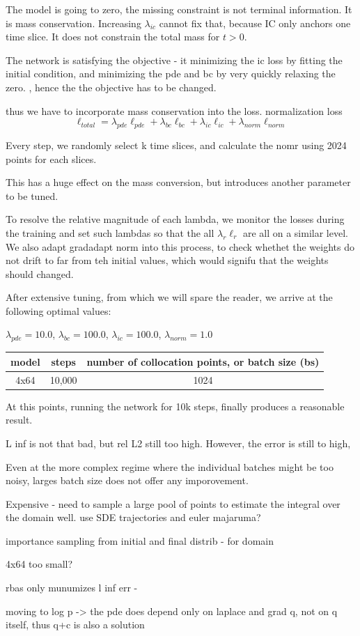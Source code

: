 The model is going to zero, the missing constraint is not terminal information. It is mass conservation.
Increasing $\lambda_{ic}$ cannot fix that, because IC only anchors one time slice. It does not constrain the total mass for $t>0$.

The network is satisfying the objective
- it minimizing the ic loss by fitting the initial condition,
and minimizing the pde and bc by very quickly relaxing the zero.
, hence the the objective has to be changed.

thus we have to incorporate mass conservation into the loss.
normalization loss
$$
\ell_{total} = \lambda_{pde}\ell_{pde}
+ \lambda_{bc}\ell_{bc}
+ \lambda_{ic}\ell_{ic}
+ \lambda_{norm}\ell_{norm}
$$


Every step, we randomly select k time slices, and
calculate the nomr using 2024 points for each slices.

This has a huge effect on the mass conversion, but introduces another
parameter to be tuned.

To resolve the relative magnitude of each lambda, we
monitor the losses during the training and set
such lambdas so that the all $\lambda_r \ell_r$
are all on a similar level.
We also adapt gradadapt norm into this process, to check whethet the 
weights do not drift to far from teh initial values,
which would signifu that the weights should changed.

After extensive tuning, from which we will spare the reader,
we arrive at the following optimal values:

\begin{center}
$\lambda_{pde} = 10.0$, $\lambda_{bc} = 100.0$, $\lambda_{ic} = 100.0$, $\lambda_{norm} = 1.0$

\medskip
\begin{tabular}{ |c|c|c| }
\hline
model & steps & number of collocation points, or batch size (bs) \\
\hline
4x64 & 10,000 & 1024 \\
\hline
\end{tabular}
\end{center}

At this points, running the network for 10k steps, finally 
produces a reasonable result.

L inf is not that bad, but rel L2 still too high.
However, the error is still to high,

Even at the more complex regime where the individual batches might be too noisy,
larges batch size does not offer any imporovement.


Expensive - need to sample a large pool of points to estimate the integral over the domain well.
use SDE trajectories and euler majaruma?


importance sampling from initial and final distrib
- for domain

4x64 too small?

rbas only munumizes l inf err - 



moving to log p -> the pde does depend only on laplace and grad q, not on q itself,
thus q+c is also a solution
